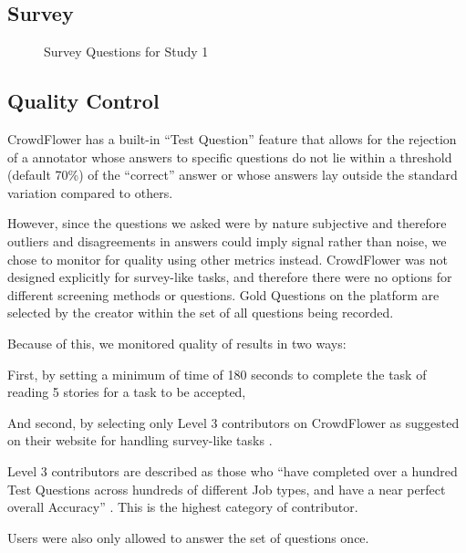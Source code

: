 \subsection{Survey} 







\begin{figure}[h!] 
\centering
  \caption{Survey Questions for Study 1}
\end{figure}








\subsection{Quality Control}

CrowdFlower has a built-in ``Test Question'' feature that allows for the rejection of a annotator whose answers to specific questions do not lie within a threshold (default 70\%) of the ``correct'' answer or whose answers lay outside the standard variation compared to others.

However, since the questions we asked were by nature subjective and therefore outliers and disagreements in answers could imply signal rather than noise, we chose to monitor for quality using other metrics instead. CrowdFlower was not designed explicitly for survey-like tasks, and therefore there were no options for different screening methods or questions. Gold Questions on the platform are selected by the creator within the set of all questions being recorded.

Because of this, we monitored quality of results in two ways:

First, by setting a minimum of time of 180 seconds to complete the task of reading 5 stories for a task to be accepted,

And second, by selecting only Level 3 contributors on CrowdFlower as suggested on their website for handling survey-like tasks \cite{CrowdFlower-guide}.

Level 3 contributors are described as those who ``have completed over a hundred Test Questions across hundreds of different Job types, and have a near perfect overall Accuracy'' \cite{Crowdflower-levels}. This is the highest category of contributor.
 
Users were also only allowed to answer the set of questions once. 

